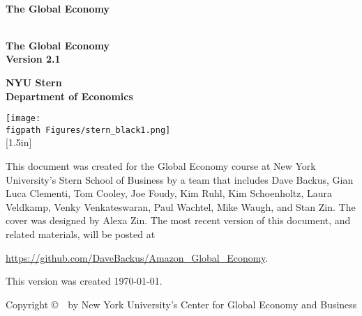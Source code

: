 \begin{titlepage}

\begin{center}
\textsc{}\\[1.5in]
{\Huge\bf\sffamily The Global Economy} \\ [0.5in]
\end{center}

\pagebreak
\phantom{x}
\thispagestyle{empty}

\pagebreak
\thispagestyle{empty}
\begin{center}
\textsc{}\\[1.5in]
{\Huge\bf\sffamily The Global Economy} \\ [0.25in]
{\huge\bf\sffamily Version 2.1}

\vspace*{1.00in}
{\huge\bf\sffamily NYU Stern}\\[1ex]
{\huge\bf\sffamily Department of  Economics}


\vfill
{\texttt{[image: \\figpath Figures/stern\_black1.png]}\\
[1.5in]
}
\end{center}


\newpage
\thispagestyle{empty}
\phantom{x}
\vfill
This document was created for the Global Economy course at New York
University's Stern School of Business by a team that includes
Dave Backus, Gian Luca Clementi, Tom Cooley, Joe Foudy, Kim Ruhl,
Kim Schoenholtz, Laura Veldkamp, Venky Venkateswaran, Paul Wachtel, Mike Waugh,
and Stan Zin.
The cover was designed by Alexa Zin.
The most recent version of this document, and related materials,
will be posted at

\vspace*{\parskip}
\centerline{\url{https://github.com/DaveBackus/Amazon_Global_Economy}.}

This version was created \today.

Copyright \copyright \ \number\year \ by New York University's Center for Global Economy and Business


\end{titlepage}
